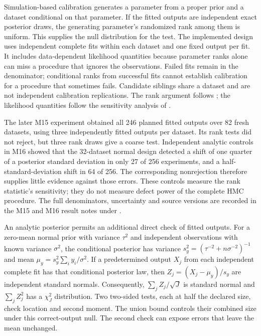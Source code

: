 Simulation-based calibration generates a parameter from a proper prior and a
dataset conditional on that parameter. If the fitted outputs are independent
exact posterior draws, the generating parameter's randomized rank among them
is uniform. This supplies the null distribution for the test. The implemented design uses independent
complete fits within each dataset and one fixed output per fit. It includes
data-dependent likelihood quantities because parameter ranks alone can miss a
procedure that ignores the observations. Failed fits remain in the denominator;
conditional ranks from successful fits cannot establish calibration for a
procedure that sometimes fails. Candidate siblings share a dataset and are not
independent calibration replications.
The rank argument follows \citet{talts2020sbc}; the likelihood quantities follow
the sensitivity analysis of \citet{modrak2023sbcquantities}.

The later M15 experiment obtained all 246 planned fitted outputs over 82 fresh
datasets, using three independently fitted outputs per dataset. Its rank tests
did not reject, but three rank draws give a coarse test. Independent analytic
controls in M16 showed that the 32-dataset normal design detected a shift of
one quarter of a posterior standard deviation in only 27 of 256 experiments,
and a half-standard-deviation shift in 64 of 256. The corresponding
nonrejection therefore supplies little evidence against those errors. These
controls measure the rank statistic's sensitivity; they do not measure defect
power of the complete HMC procedure. The full denominators, uncertainty and
source versions are recorded in the M15 and M16 result notes under
.

An analytic posterior permits an additional direct check of fitted outputs.
For a zero-mean normal prior with variance $\tau^2$ and independent observations with
known variance $\sigma^2$, the conditional posterior has variance
$s_y^2=(\tau^{-2}+n\sigma^{-2})^{-1}$ and mean
$\mu_y=s_y^2\sum_i y_i/\sigma^2$. If a predetermined output $X_j$ from each
independent complete fit has that conditional posterior law, then
$Z_j=(X_j-\mu_y)/s_y$ are independent standard normals. Consequently,
$\sum_j Z_j/\sqrt{J}$ is standard normal and $\sum_j Z_j^2$ has a
$\chi^2_J$ distribution. Two two-sided tests, each at half the declared size,
check location and second moment. The union bound controls their combined
size under this correct-output null. The second check can expose errors that
leave the mean unchanged.

